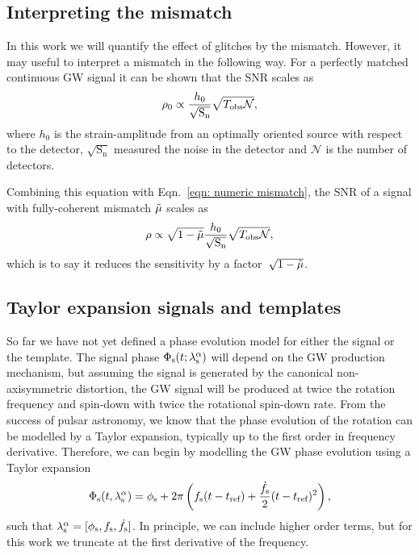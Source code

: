 \documentclass[../full_thesis/full_thesis.tex]{subfiles}
\begin{document}
\subsection{Interpreting the mismatch}
In this work we will quantify the effect of glitches by the mismatch. However,
it may useful to interpret a mismatch in the following way. For a perfectly
matched continuous GW signal it can be shown \citep{Jaranowski1998} that the SNR scales as
\begin{equation}
\rho_{0} \propto \frac{h_{0}}{\sqrt{\textrm{S}_{\textrm{n}}}}
                               \sqrt{T_{\mathrm{obs}} \mathcal{N}},
\end{equation}
where $h_{0}$ is the strain-amplitude from an optimally oriented source with
respect to the detector, $\sqrt{\textrm{S}_{\textrm{n}}}$ measured the noise
in the detector and $\mathcal{N}$ is the number of detectors.

Combining this equation with Eqn.~\eqref{eqn: numeric mismatch}, the SNR of a signal
with fully-coherent mismatch $\tilde{\mu}$ scales as
\begin{equation}
\rho \propto \sqrt{1-\tilde{\mu}} \frac{h_{0}}{\sqrt{\textrm{S}_{\textrm{n}}}}
                               \sqrt{T_{\mathrm{obs}} \mathcal{N}},
\end{equation}
which is to say it reduces the sensitivity by a factor~$\sqrt{1-\tilde{\mu}}$.



\subsection{Taylor expansion signals and templates}
So far we have not yet defined a phase evolution model for either the signal or the template.
The signal phase $\Phi_{\textrm{s}}(t; {\lambda}_\textrm{s}^{\alpha})$ will depend on the GW production mechanism,
but assuming the signal is generated by the canonical non-axisymmetric distortion,
the GW signal will be produced at twice the rotation frequency and spin-down
with twice the rotational spin-down rate. From the success of pulsar astronomy,
we know that the phase evolution of the rotation can be modelled by a Taylor
expansion, typically up to the first order in frequency derivative. Therefore,
we can begin by modelling the GW phase evolution using a Taylor expansion
\begin{equation}
\Phi_{\textrm{s}} (t, {\lambda}_\textrm{s}^{\alpha}) = \phi_{\textrm{s}} + 2\pi \left(f_{\textrm{s}} (t - t_{\textrm{ref}})
+ \frac{\dot{f}_{\textrm{s}}}{2}(t - t_{\textrm{ref}})^{2} \right),
\label{eqn: Taylor lambda signal}
\end{equation}
such that ${\lambda}_\textrm{s}^{\alpha} = [\phi_{\textrm{s}}, f_{\textrm{s}}, \dot{f}_{\textrm{s}}]$. In principle, we can include
higher order terms, but for this work we truncate at the first
derivative of the frequency.
\end{document}
